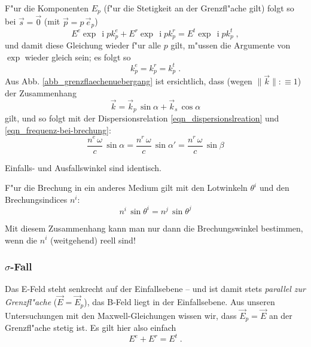 \documentclass[twoside,a4paper]{book}
\newcommand{\I}{\ensuremath{\operatorname{i}}}
\begin{document}
F"ur die Komponenten $E_p$ (f"ur die Stetigkeit an der Grenzfl"ache
gilt) folgt so bei $\vec s = \vec 0$ (mit $\vec p = p \, \vec e_p$)
\begin{equation*}
   E^e \exp \, \I p k_p^e +    E^r \exp \, \I p k_p^r  =    E^t \exp \, \I p k_p^t \;,
\end{equation*}
und damit diese Gleichung wieder f"ur alle $p$ gilt, m"ussen die
Argumente von $\exp$ wieder gleich sein; es folgt so
\begin{equation}
   \label{eq:43}
   k_p^e = k_p^r = k_p^t \;.
\end{equation}
Aus Abb. \ref{abb_grenzflaechenuebergang} ist ersichtlich, dass (wegen
$\| \vec k \| :\equiv 1$) der
Zusammenhang
\begin{equation}
   \label{eq:44}
   \vec k = \vec k_p \, \sin \alpha  +  \vec k_s \, \cos \alpha 
\end{equation}
gilt, und so folgt mit der Dispersionsrelation
\eqref{eqn_dispersionslreation} und \eqref{eqn_frequenz-bei-brechung}:
\begin{equation}
   \label{eqn_snellius}
\boxed{   \frac{n^e \, \omega}{c} \, \sin \alpha = 
   \frac{n^r \, \omega}{c} \, \sin \alpha' = 
   \frac{n^r \, \omega}{c} \, \sin \beta  }
\end{equation}
\begin{Wichtig}
   Einfalls- und Ausfallswinkel sind identisch.

   F"ur die Brechung in ein anderes Medium gilt mit den Lotwinkeln
   $\theta^i$ und den Brechungsindices $n^i$:
   \begin{equation*}
      n^i \, \sin  \theta^i = n^j \, \sin \theta ^j
   \end{equation*}

   Mit diesem Zusammenhang kann man nur dann die Brechungswinkel
   bestimmen, wenn die $n^i$ (weitgehend) reell sind!
\end{Wichtig}










\subsubsection{$\sigma$-Fall}
\label{kap_sigma-fall}

Das E-Feld steht senkrecht auf der Einfallsebene -- und ist damit
stets \emph{parallel zur Grenzfl"ache} ($\vec E = \vec E_p$), das
B-Feld liegt in der Einfallsebene. Aus unseren Untersuchungen mit den
Maxwell-Gleichungen wissen wir, dass $\vec E_p = \vec E$ an der Grenzfl"ache
stetig ist. 
Es gilt hier also einfach
\begin{equation}
\label{eqn_sigma-fall_e}
   E^e + E^r = E^t \;.
\end{equation}
\end{document}
